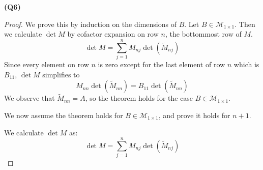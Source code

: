 \documentclass[12pt, a4paper]{article}
\begin{document}
\textbf{(Q6)}
\begin{proof}
    We prove this by induction on the dimensions of $B$.
    Let $B \in \mathcal{M}_{1 \times 1}$. Then we calculate
    $\det M$ by cofactor expansion on row $n$, the bottommost
    row of $M$.
    \[
        \det M = \sum_{j = 1}^n M_{nj} \det (\tilde{M}_{nj})
    \]
    Since every element on row $n$ is zero except for the last
    element of row $n$ which is $B_{11}$, $\det M$ simplifies
    to
    \[
        M_{nn} \det (\tilde{M}_{nn}) = B_{11} \det (\tilde{M}_{nn})
    \]
    We observe that $\tilde{M}_{nn} = A$, so the theorem holds
    for the case $B \in \mathcal{M}_{1 \times 1}$.

    We now assume the theorem holds for
    $B \in \mathcal{M}_{1 \times 1}$, and prove it holds for $n + 1$.

    We calculate $\det M$ as:
    \[
        \det M = \sum_{j = 1}^n M_{nj} \det (\tilde{M}_{nj})
    \]
\end{proof}
\end{document}
